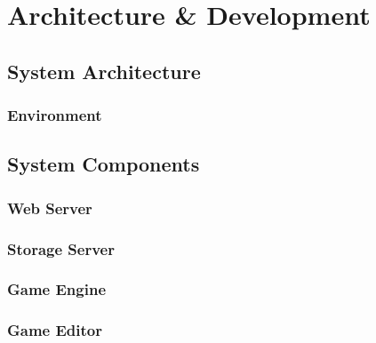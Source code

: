\chapter{Architecture \& Development}
\section{System Architecture}
	\subsection{Environment}


\section{System Components}
% 
	\subsection{Web Server}
	\subsection{Storage Server}

	\subsection{Game Engine}
	\subsection{Game Editor}
